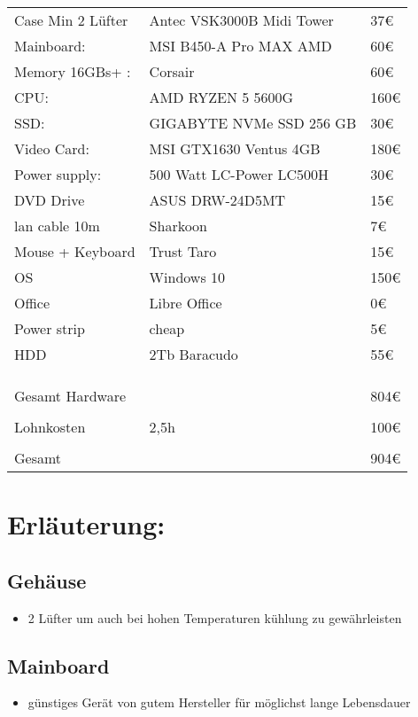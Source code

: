 \documentclass[11pt]{article}
\begin{document}
\begin{center}
\begin{tabular}{lll}
Case Min 2 Lüfter & Antec VSK3000B Midi Tower & 37€\\
Mainboard: & MSI B450-A Pro MAX AMD & 60€\\
Memory 16GBs+ : & Corsair & 60€\\
CPU: & AMD RYZEN 5 5600G & 160€\\
SSD: & GIGABYTE NVMe SSD 256 GB & 30€\\
Video Card: & MSI GTX1630 Ventus 4GB & 180€\\
Power supply: & 500 Watt LC-Power LC500H & 30€\\
DVD Drive & ASUS DRW-24D5MT & 15€\\
lan cable 10m & Sharkoon & 7€\\
Mouse + Keyboard & Trust Taro & 15€\\
OS & Windows 10 & 150€\\
Office & Libre Office & 0€\\
Power strip & cheap & 5€\\
HDD & 2Tb Baracudo & 55€\\
 &  & \\
 &  & \\
 &  & \\
Gesamt Hardware &  & 804€\\
 &  & \\
\hline
Lohnkosten & 2,5h & 100€\\
 &  & \\
\hline
Gesamt &  & 904€\\
\end{tabular}
\end{center}


\section{Erläuterung:}
\label{sec:orgb06bbb0}
\subsection{Gehäuse}
\label{sec:org35a26cc}
\begin{itemize}
\item 2 Lüfter um auch bei hohen Temperaturen kühlung zu gewährleisten
\end{itemize}
\subsection{Mainboard}
\label{sec:org796b459}
\begin{itemize}
\item günstiges Gerät von gutem Hersteller für möglichst lange Lebensdauer
\end{itemize}
\end{document}
